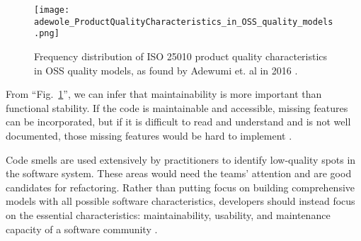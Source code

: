 \begin{figure}[ht]
  \centerline{
      \texttt{[image: adewole\_ProductQualityCharacteristics\_in\_OSS\_quality\_models.png]}
  }
  \caption{Frequency distribution of ISO 25010 product quality characteristics in OSS quality models, as found by Adewumi et. al in 2016 \cite{adewumi:2016}.}
  \label{figFreqDistProductQualityModel}
\end{figure}

From ``Fig.~\ref{figFreqDistProductQualityModel}'', we can infer that maintainability is more important than functional stability. If the code is maintainable and accessible, missing features can be incorporated, but if it is difficult to read and understand and is not well documented, those missing features would be hard to implement \cite{adewumi:2016}.

Code smells are used extensively by practitioners to identify low-quality spots in the software system. These areas would need the teams' attention and are good candidates for refactoring. Rather than putting focus on building comprehensive models with all possible software characteristics, developers should instead focus on the essential characteristics: maintainability, usability, and maintenance capacity of a software community \cite{adewumi:2016}.

